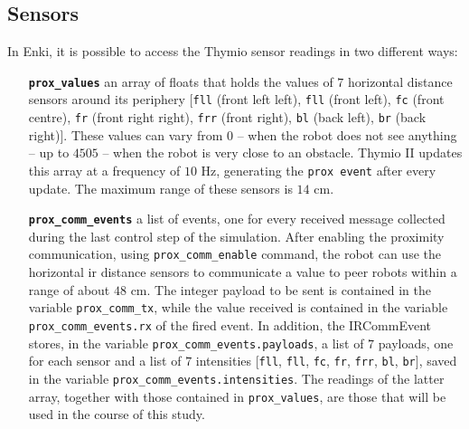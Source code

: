 \subsection{Sensors}
\label{subsec:enkisensors}
In Enki, it is possible to access the Thymio sensor readings in two different ways:

\begin{enumerate}[resume, wide=\parindent, leftmargin=\parindent, 
rightmargin=\parindent]
	
	\item[\textbf{\texttt{prox\_values}}] an array of floats that holds the values of 
	$7$ horizontal distance sensors around its periphery [\texttt{fll} (front left left), 
	\texttt{fll} (front left), \texttt{fc} (front centre), \texttt{fr} (front right right), 
	\texttt{frr} (front right), \texttt{bl} (back left), \texttt{br} (back right)]. 
	These values can vary from $0$ – when the robot does not see anything – up to 
	$4505$ – when the robot is very close to an obstacle. 
	Thymio II updates this array at a frequency of $10$ \gls{Hz}, generating the 
	\texttt{prox event} after every update. 
	The maximum range of these sensors is $14$ \gls{cm}.

	\item[\textbf{\texttt{prox\_comm\_events}}] a list of events, one for every 
	received message collected during the last control step of the simulation. 
	After enabling the proximity communication, using 
	\texttt{prox\_comm\_enable} command, the robot can use the horizontal 
	\gls{ir} distance sensors to communicate a value to peer robots within a range 
	of about $48$ \gls{cm}. 
	The integer payload to be sent is contained in the variable 
	\texttt{prox\_comm\_tx}, while the value received is contained in the variable 
	\texttt{prox\_comm\_events.rx} of the fired event.
	In addition, the IRCommEvent stores, in the variable 
	\texttt{prox\_comm\_events.payloads}, a list of $7$ payloads, one for each 
	sensor and a list of  $7$ intensities  [\texttt{fll}, \texttt{fll}, \texttt{fc}, \texttt{fr}, 
	\texttt{frr}, \texttt{bl}, \texttt{br}], saved in the variable 
	\texttt{prox\_comm\_events.intensities}.
	The readings of the latter array, together with those contained in 
	\texttt{prox\_values}, are those that will be used in the course of this study.
\end{enumerate}

